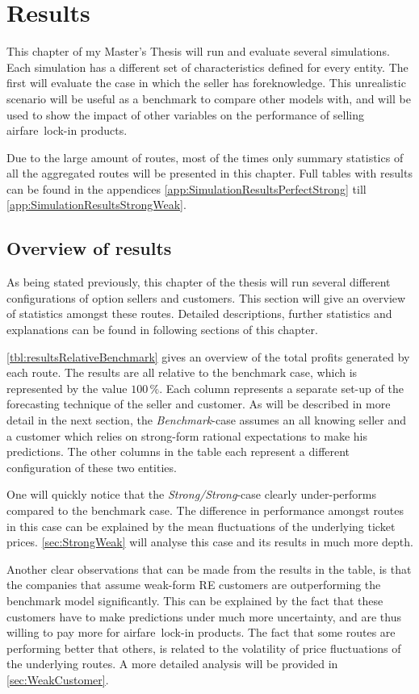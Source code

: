 \chapter{Results}
This chapter of my Master's Thesis will run and evaluate several simulations. Each simulation has a different set of characteristics defined for every entity. The first will evaluate the case in which the seller has foreknowledge. This unrealistic scenario will be useful as a benchmark to compare other models with, and will be used to show the impact of other variables on the performance of selling airfare~lock-in products.

Due to the large amount of routes, most of the times only summary statistics of all the aggregated routes will be presented in this chapter. Full tables with results can be found in the appendices \ref{app:SimulationResultsPerfectStrong} till \ref{app:SimulationResultsStrongWeak}.

\section{Overview of results}
As being stated previously, this chapter of the thesis will run several different configurations of option sellers and customers. This section will give an overview of statistics amongst these routes. Detailed descriptions, further statistics and explanations can be found in following sections of this chapter.

\autoref{tbl:resultsRelativeBenchmark} gives an overview of the total profits generated by each route. The results are all relative to the benchmark case, which is represented by the value $100\,\%$. Each column represents a separate set-up of the forecasting technique of the seller and customer. As will be described in more detail in the next section, the \emph{Benchmark}-case assumes an all knowing seller and a customer which relies on strong-form rational expectations to make his predictions. The other columns in the table each represent a different configuration of these two entities.

One will quickly notice that the \emph{Strong/Strong}-case clearly under-performs compared to the benchmark case. The difference in performance amongst routes in this case can be explained by the mean fluctuations of the underlying ticket prices. \autoref{sec:StrongWeak} will analyse this case and its results in much more depth.

Another clear observations that can be made from the results in the table, is that the companies that assume weak-form RE customers are outperforming the benchmark model significantly. This can be explained by the fact that these customers have to make predictions under much more uncertainty, and are thus willing to pay more for airfare~lock-in products. The fact that some routes are performing better that others, is related to the volatility of price fluctuations of the underlying routes. A more detailed analysis will be provided in \autoref{sec:WeakCustomer}.

